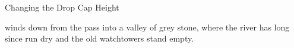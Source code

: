 \begin{ExampleBlock}{Changing the Drop Cap Height}

 winds down from the pass into a valley of grey stone, where the river has long since run dry and the old watchtowers stand empty.


\end{ExampleBlock}

